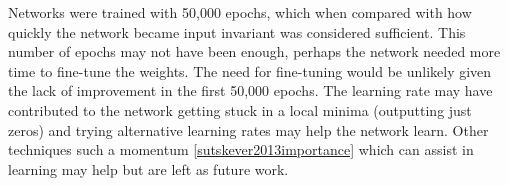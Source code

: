 Networks were trained with 50,000 epochs, which when compared with how quickly the network became input invariant was considered sufficient.
This number of epochs may not have been enough, perhaps the network needed more time to fine-tune the weights. 
The need for fine-tuning would be unlikely given the lack of improvement in the first 50,000 epochs. 
The learning rate may have contributed to the network getting stuck in a local minima (outputting just zeros) and trying alternative learning rates may help the network learn.
Other techniques such a momentum \ref{sutskever2013importance} which can assist in learning may help but are left as future work.






























